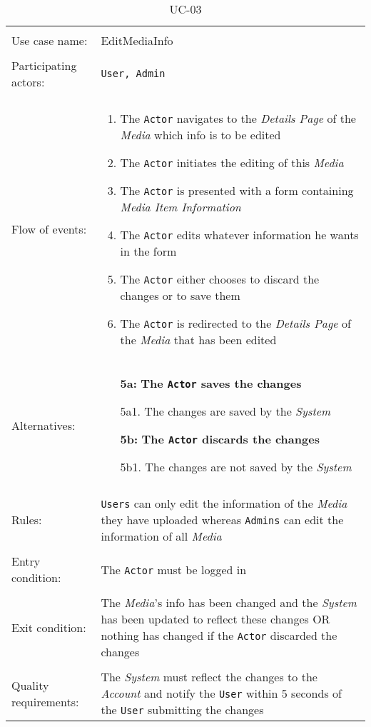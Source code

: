 \noindent
\begin{table}[h!]
\caption{UC-03}
\label{UC-03}
\centering
\begin{tabular}{ l  p{8cm} }  
\hline
\\
Use case name:  & EditMediaInfo   \\   \hline    
\\            
Participating actors:  & \texttt{\texttt{User}, \texttt{Admin}} \\   \hline   
\\             
Flow of events: & \begin{enumerate}
\item{The \texttt{Actor} navigates to the \textit{Details Page} of the \textit{Media} which info is to be edited}
\item{The \texttt{Actor} initiates the editing of this \textit{Media}}
\item{The \texttt{Actor} is presented with a form containing \textit{Media Item Information}}
\item{The \texttt{Actor} edits whatever information he wants in the form}
\item{The \texttt{Actor} either chooses to discard the changes or to save them}
\item{The \texttt{Actor} is redirected to the \textit{Details Page} of the \textit{Media} that has been edited}
\end{enumerate}
\\
Alternatives: & \begin{itemize}
\item[\textbf{5a:}]{\textbf{The \texttt{Actor} saves the changes}}
\item[]  5a1. The changes are saved by the \textit{System}
\item[\textbf{5b:}]{\textbf{The \texttt{Actor} discards the changes}}
\item[]  5b1. The changes are not saved by the \textit{System}
\end{itemize}
\\ \hline
\\
Rules: & \texttt{Users} can only edit the information of the \textit{Media} they have uploaded whereas \texttt{Admins} can edit the information of all \textit{Media}
\\   \hline 
\\
Entry condition: & The \texttt{Actor} must be logged in \\ \hline
\\
Exit condition: & The \textit{Media}'s info has been changed and the \textit{System} has been updated to reflect these changes OR
nothing has changed if the \texttt{Actor} discarded the changes \\ \hline
\\
Quality requirements: & The \textit{System} must reflect the changes to the \textit{Account} and notify the \texttt{User} within 5 seconds of the \texttt{User} submitting the changes \\ \hline  
\end{tabular}
\end{table}


